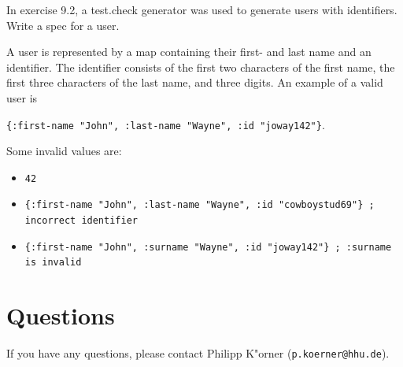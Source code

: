 \documentclass[11pt,a4paper]{article}
\begin{document}
\begin{exercise}[Specs II]
    In exercise 9.2, a test.check generator was used to generate users with identifiers.
    Write a spec for a user.

    A user is represented by a map
    containing their first- and last name and an identifier.
    The identifier consists of the first two characters of the first name,
    the first three characters of the last name, and three digits.
    An example of a valid user is 
    
    \verb|{:first-name "John", :last-name "Wayne", :id "joway142"}|.

    Some invalid values are:
    \begin{itemize}
        \item \verb|42|
        \item \verb|{:first-name "John", :last-name "Wayne", :id "cowboystud69"} ; incorrect identifier|
        \item \verb|{:first-name "John", :surname "Wayne", :id "joway142"} ; :surname is invalid|
    \end{itemize}
\end{exercise}


\section*{Questions}
If you have any questions, please contact Philipp K"orner (\texttt{p.koerner@hhu.de}).
\end{document}
